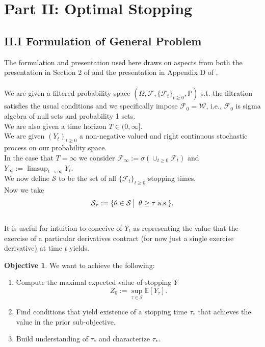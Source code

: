 \documentclass[12pt]{article}
\newcommand{\cF}{\mathcal{F}}
\newcommand{\cS}{\mathcal{S}}
\newcommand{\E}{\mathbb{E}}
\newcommand{\Prb}{\mathbb{P}}
\newcommand{\quantifyspace}{\hspace{2px} \big | \hspace{5px}}
\newcommand{\cheekynewline}{$\text{ }$\\}
\newcommand{\cFPS}{(\Omega, \cF, \{ \cF_t\}_{t \geq 0}, \Prb)}
\newcommand{\cFi}{\{\cF_t\}_{t \geq 0}}
\newcommand{\sspc}{\hspace{3 px}}
\newcommand{\als}{\text{a.s.}}
\theoremstyle{definition}
\newtheorem{obj}{Objective}
\begin{document}
\section*{Part II: Optimal Stopping}\label{sec:part2}
\subsection*{\quad II.I Formulation of General Problem}\label{sec:II.I}
The formulation and presentation used here draws on aspects from both the presentation in Section 2 of \cite{carmona2008} and the presentation in Appendix D of \cite{karatzas1998}. \\
\\
We are given a filtered probability space $\cFPS$ s.t. the filtration satisfies the usual conditions and we specifically impose $\cF_0 = \mathcal{W}$, i.e., $\cF_0$ is sigma algebra of null sets and probability 1 sets. \\
We are also given a time horizon $T \in (0, \infty]$. \\
We are given $(Y_t)_{t \geq 0}$ a non-negative valued and right continuous stochastic process on our probability space. \\
In the case that $T = \infty$ we consider $\cF_\infty := \sigma ( \cup_{t \geq 0} \cF_t)$ and $Y_\infty := \limsup_{t \to \infty} Y_t$. \\
We now define $\mathcal{S}$ to be the set of all $\cFi$ stopping times. \\
Now we take
\[
    \cS_\tau := \{\theta \in \cS \quantifyspace \theta \geq \tau \sspc \als \}.
\]
\cheekynewline

It is useful for intuition to conceive of $Y_t$ as representing the value that the exercise of a particular derivatives contract (for now just a single exercise derivative) at time $t$ yields.

\begin{obj} \cite{karatzas1998}
    We want to achieve the following:
    \begin{enumerate}
        \item[(i)] Compute the maximal expected value of stopping $Y$
            \[
                Z_0 := \sup_{\tau \in \cS} \E[Y_\tau].
            \]
        \item[(ii)] Find conditions that yield existence of a stopping time $\tau_*$ that achieves the value in the prior sub-objective.
        \item[(iii)] Build understanding of $\tau_*$ and characterize $\tau_*$.
    \end{enumerate}
\end{obj}
\end{document}

